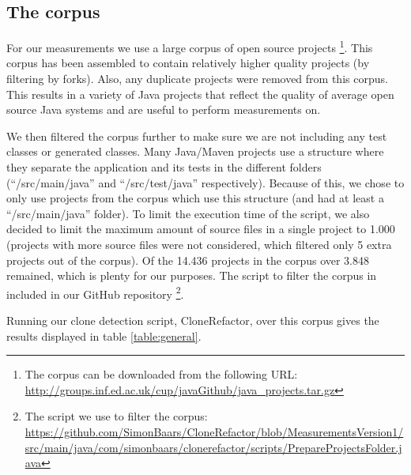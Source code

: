 \documentclass[a4paper]{article}
\begin{document}
\subsection{The corpus}
For our measurements we use a large corpus of open source projects \cite{githubCorpus2013}\footnote{The corpus can be downloaded from the following URL: \url{http://groups.inf.ed.ac.uk/cup/javaGithub/java_projects.tar.gz}}. This corpus has been assembled to contain relatively higher quality projects (by filtering by forks). Also, any duplicate projects were removed from this corpus. This results in a variety of Java projects that reflect the quality of average open source Java systems and are useful to perform measurements on.

We then filtered the corpus further to make sure we are not including any test classes or generated classes. Many Java/Maven projects use a structure where they separate the application and its tests in the different folders (``/src/main/java'' and ``/src/test/java'' respectively). Because of this, we chose to only use projects from the corpus which use this structure (and had at least a ``/src/main/java'' folder). To limit the execution time of the script, we also decided to limit the maximum amount of source files in a single project to 1.000 (projects with more source files were not considered, which filtered only 5 extra projects out of the corpus). Of the 14.436 projects in the corpus over 3.848 remained, which is plenty for our purposes. The script to filter the corpus in included in our GitHub repository \footnote{The script we use to filter the corpus: \url{https://github.com/SimonBaars/CloneRefactor/blob/MeasurementsVersion1/src/main/java/com/simonbaars/clonerefactor/scripts/PrepareProjectsFolder.java}}.

Running our clone detection script, CloneRefactor, over this corpus gives the results displayed in table \ref{table:general}.
\end{document}
